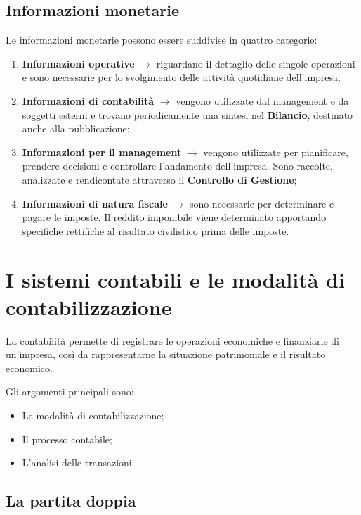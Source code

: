 \subsection{Informazioni monetarie}
Le informazioni monetarie possono essere suddivise in quattro categorie:
\begin{enumerate}
    \item \textbf{Informazioni operative} $\rightarrow$ riguardano il dettaglio delle singole operazioni e sono necessarie per 
    lo svolgimento delle attività quotidiane dell'impresa;
    \item \textbf{Informazioni di contabilità} $\rightarrow$ vengono utilizzate dal management e da soggetti esterni e trovano 
    periodicamente una sintesi nel \textbf{Bilancio}, destinato anche alla pubblicazione;
    \item \textbf{Informazioni per il management} $\rightarrow$ vengono utilizzate per pianificare, prendere decisioni e controllare 
    l'andamento dell'impresa. Sono raccolte, analizzate e rendicontate attraverso il \textbf{Controllo di Gestione};
    \item \textbf{Informazioni di natura fiscale} $\rightarrow$ sono necessarie per determinare e pagare le imposte. Il reddito 
    imponibile viene determinato apportando specifiche rettifiche al risultato civilistico prima delle imposte.
\end{enumerate}
\section{I sistemi contabili e le modalità di contabilizzazione}

\noindent La contabilità permette di registrare le operazioni
economiche e finanziarie di un'impresa, così da rappresentarne
la situazione patrimoniale e il risultato economico.

\medskip

\noindent Gli argomenti principali sono:

\begin{itemize}
    \item Le modalità di contabilizzazione;
    \item Il processo contabile;
    \item L'analisi delle transazioni.
\end{itemize}


\subsection{La partita doppia}

